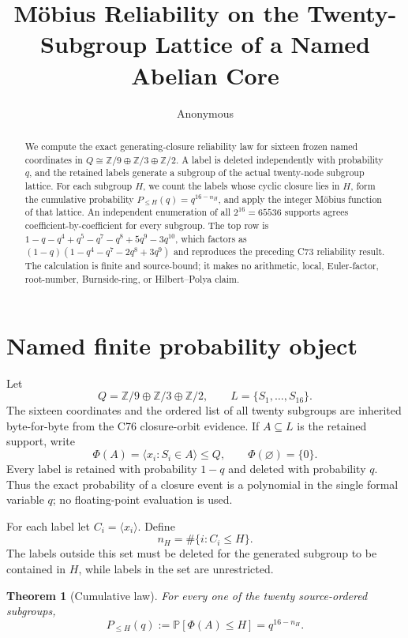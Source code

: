 \documentclass[10pt]{article}
\title{Möbius Reliability on the Twenty-Subgroup Lattice of a Named Abelian Core}
\author{Anonymous}
\date{}
\newtheorem{theorem}{Theorem}
\newcommand{\Z}{\mathbb Z}
\newcommand{\Prb}{\mathbb P}
\newcommand{\PhiC}{\Phi}
\begin{document}
\maketitle

\begin{abstract}
We compute the exact generating-closure reliability law for sixteen frozen
named coordinates in $Q\cong\Z/9\oplus\Z/3\oplus\Z/2$.  A label is deleted
independently with probability $q$, and the retained labels generate a
subgroup of the actual twenty-node subgroup lattice.  For each subgroup $H$,
we count the labels whose cyclic closure lies in $H$, form the cumulative
probability $P_{\leq H}(q)=q^{16-n_H}$, and apply the integer Möbius function
of that lattice.  An independent enumeration of all $2^{16}=65536$ supports
agrees coefficient-by-coefficient for every subgroup.  The top row is
\(1-q-q^4+q^5-q^7-q^8+5q^9-3q^{10}\), which factors as
\((1-q)(1-q^4-q^7-2q^8+3q^9)\) and reproduces the preceding C73
reliability result.  The calculation is finite and source-bound; it makes no
arithmetic, local, Euler-factor, root-number, Burnside-ring, or Hilbert--Polya
claim.
\end{abstract}

\section{Named finite probability object}
Let
\[
 Q=\Z/9\oplus\Z/3\oplus\Z/2,
 \qquad L=\{S_1,\ldots,S_{16}\}.
\]
The sixteen coordinates and the ordered list of all twenty subgroups are
inherited byte-for-byte from the C76 closure-orbit evidence.  If
$A\subseteq L$ is the retained support, write
\[
 \PhiC(A)=\langle x_i:S_i\in A\rangle\leq Q,
 \qquad \PhiC(\varnothing)=\{0\}.
\]
Every label is retained with probability $1-q$ and deleted with probability
$q$.  Thus the exact probability of a closure event is a polynomial in the
single formal variable $q$; no floating-point evaluation is used.

For each label let $C_i=\langle x_i\rangle$.  Define
\[
 n_H=\#\{i:C_i\leq H\}.
\]
The labels outside this set must be deleted for the generated subgroup to be
contained in $H$, while labels in the set are unrestricted.

\begin{theorem}[Cumulative law]
For every one of the twenty source-ordered subgroups,
\[
 P_{\leq H}(q):=\Prb[\PhiC(A)\leq H]=q^{16-n_H}.
\]
\end{theorem}
\end{document}
